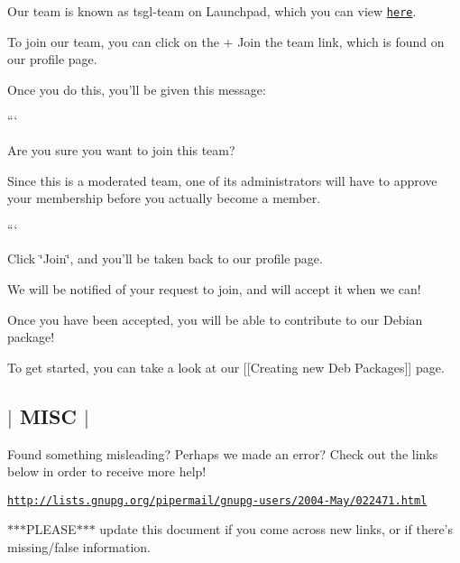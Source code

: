 Our team is known as {\ttfamily tsgl-\/team} on Launchpad, which you can view \href{https://launchpad.net/~tsgl-test}{\tt here}.

To join our team, you can click on the {\ttfamily + Join the team} link, which is found on our profile page.

Once you do this, you'll be given this message\-:

``` \begin{DoxyVerb}Are you sure you want to join this team?

Since this is a moderated team, one of its administrators will have to approve your membership before you actually become a member. 
\end{DoxyVerb}


```

Click \char`\"{}\-Join\char`\"{}, and you'll be taken back to our profile page.

We will be notified of your request to join, and will accept it when we can!

Once you have been accepted, you will be able to contribute to our Debian package!

To get started, you can take a look at our \mbox{[}\mbox{[}Creating new Deb Packages\mbox{]}\mbox{]} page. 

 \subsection*{$\vert$ M\-I\-S\-C $\vert$ }

Found something misleading? Perhaps we made an error? Check out the links below in order to receive more help!

\href{http://lists.gnupg.org/pipermail/gnupg-users/2004-May/022471.html}{\tt http\-://lists.\-gnupg.\-org/pipermail/gnupg-\/users/2004-\/\-May/022471.\-html}

$\ast$$\ast$$\ast$\-P\-L\-E\-A\-S\-E$\ast$$\ast$$\ast$ update this document if you come across new links, or if there's missing/false information. 